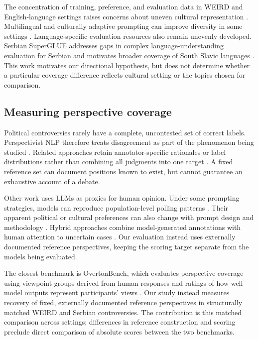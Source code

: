 \documentclass[11pt,a4paper]{article}
\begin{document}
The concentration of training, preference, and evaluation data in WEIRD and English-language settings raises concerns about uneven cultural representation \cite{sorensenRoadmapPluralisticAlignment2024, wangMultilingualPromptingImproving2025, zewailMoralStereotypingLarge2026}. Multilingual and culturally adaptive prompting can improve diversity in some settings \cite{wangMultilingualPromptingImproving2025}. Language-specific evaluation resources also remain unevenly developed. Serbian SuperGLUE addresses gaps in complex language-understanding evaluation for Serbian and motivates broader coverage of South Slavic languages \cite{perovicSerbianSuperGLUEEvaluation2026}. This work motivates our directional hypothesis, but does not determine whether a particular coverage difference reflects cultural setting or the topics chosen for comparison.

\subsection{Measuring perspective coverage}
\label{sec:Measuring perspective coverage}
Political controversies rarely have a complete, uncontested set of correct labels. Perspectivist NLP therefore treats disagreement as part of the phenomenon being studied \cite{basileWeNeedConsider2021, plankProblemHumanLabel2022a, frendaPerspectivistApproachesNatural2025a}. Related approaches retain annotator-specific rationales or label distributions rather than combining all judgments into one target \cite{sarumiFineGrainedPerspectivesModeling2026, shettyLearningWhoDisagrees2026}. A fixed reference set can document positions known to exist, but cannot guarantee an exhaustive account of a debate.

Other work uses LLMs as proxies for human opinion. Under some prompting strategies, models can reproduce population-level polling patterns \cite{sunRandomSiliconSampling2024, gongCharacterizingAbilityLLMs2026}. Their apparent political or cultural preferences can also change with prompt design and methodology \cite{khanRandomnessNotRepresentation2025}. Hybrid approaches combine model-generated annotations with human attention to uncertain cases \cite{mehrotraMultiPerspectiveLLMAnnotations2026}. Our evaluation instead uses externally documented reference perspectives, keeping the scoring target separate from the models being evaluated.

The closest benchmark is OvertonBench, which evaluates perspective coverage using viewpoint groups derived from human responses and ratings of how well model outputs represent participants' views \cite{poole-dayanBenchmarkingOvertonPluralism2025}. Our study instead measures recovery of fixed, externally documented reference perspectives in structurally matched WEIRD and Serbian controversies. The contribution is this matched comparison across settings; differences in reference construction and scoring preclude direct comparison of absolute scores between the two benchmarks.
\end{document}
